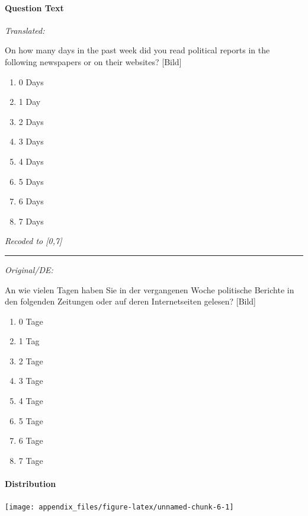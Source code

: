 \documentclass[
]{article}
\providecommand{\tightlist}{%
  \setlength{\itemsep}{0pt}\setlength{\parskip}{0pt}}
\begin{document}
\hypertarget{question-text-5}{%
\paragraph{Question Text}\label{question-text-5}}

\emph{Translated:}

On how many days in the past week did you read political reports in the following newspapers or on their websites? {[}Bild{]}

\begin{enumerate}
\def\labelenumi{(\arabic{enumi})}
\tightlist
\item
  0 Days
\item
  1 Day
\item
  2 Days
\item
  3 Days
\item
  4 Days
\item
  5 Days
\item
  6 Days
\item
  7 Days
\end{enumerate}

\emph{Recoded to {[}0,7{]}}

\begin{center}\rule{0.5\linewidth}{0.5pt}\end{center}

\emph{Original/DE:}

An wie vielen Tagen haben Sie in der vergangenen Woche politische Berichte in den folgenden Zeitungen oder auf deren Internetseiten gelesen? {[}Bild{]}

\begin{enumerate}
\def\labelenumi{(\arabic{enumi})}
\tightlist
\item
  0 Tage
\item
  1 Tag
\item
  2 Tage
\item
  3 Tage
\item
  4 Tage
\item
  5 Tage
\item
  6 Tage
\item
  7 Tage
\end{enumerate}

\hypertarget{distribution-5}{%
\paragraph{Distribution}\label{distribution-5}}

\begin{center}\texttt{[image: appendix\_files/figure-latex/unnamed-chunk-6-1]} \end{center}
\end{document}
